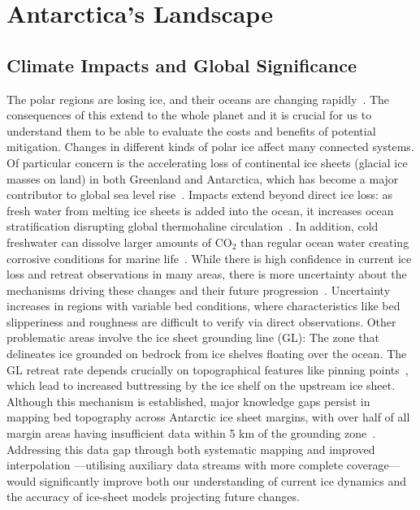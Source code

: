 \chapter{Antarctica's Landscape}\label{why}
\section{Climate Impacts and Global Significance}
The polar regions are losing ice, and their oceans are changing rapidly~\cite{O_C_in_changingClimate}. The consequences of this extend to the whole planet and it is crucial for us to understand them to be able to evaluate the costs and benefits of potential mitigation. 
Changes in different kinds of polar ice affect many connected systems. Of particular concern is the accelerating loss of continental ice sheets (glacial ice masses on land) in both Greenland and Antarctica, which has become a major contributor to global sea level rise~\cite{O_C_in_changingClimate}. Impacts extend beyond direct ice loss: as fresh water from melting ice sheets is added into the ocean, it increases ocean stratification disrupting global thermohaline circulation~\cite{Jacobs_2004}. In addition, cold freshwater can dissolve larger amounts of $\mathrm{CO_2}$ than regular ocean water creating corrosive conditions for marine life~\cite{O_C_in_changingClimate}.
While there is high confidence in current ice loss and retreat observations in many areas, there is more uncertainty about the mechanisms driving these changes and their future progression~\cite{Fox-Kemper_2021}. Uncertainty increases in regions with variable bed conditions, where characteristics like bed slipperiness and roughness are difficult to verify via direct observations. Other problematic areas involve the ice sheet grounding line (GL): The zone that delineates ice grounded on bedrock from ice shelves floating over the ocean. The GL retreat rate depends crucially on topographical features like pinning points~\cite{Fox-Kemper_2021}, which lead to increased buttressing by the ice shelf on the upstream ice sheet. Although this mechanism is established, major knowledge gaps persist in mapping bed topography across Antarctic ice sheet margins, with over half of all margin areas having insufficient data within 5 km of the grounding zone~\cite{RINGS_2022}. Addressing this data gap through both systematic mapping and improved interpolation —utilising auxiliary data streams with more complete coverage— would significantly improve both our understanding of current ice dynamics and the accuracy of ice-sheet models projecting future changes.

